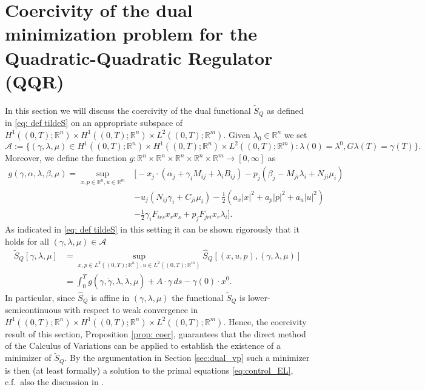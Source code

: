 \documentclass[11pt]{article}
\newcommand{\R}{\mathbb R}
\begin{document}
\section{Coercivity of the dual minimization problem for the Quadratic-Quadratic Regulator (QQR)}\label{sec:analysis}

In this section we will discuss the coercivity of the dual functional $\tilde{S}_Q$ as defined in \eqref{eq: def tildeS} on an appropriate subspace of $H^1((0,T); \R^n) \times H^1((0,T); \R^n) \times L^2((0,T); \R^m)$. 
Given $\lambda_0 \in \R^n$ we set
\[
\mathcal{A}:=\{(\gamma,\lambda,\mu) \in H^1((0,T); \R^n) \times H^1((0,T); \R^n) \times L^2((0,T); \R^m): \lambda(0) = \lambda^0, G \lambda(T) = \gamma(T)  \}.
\]
Moreover, we define the function $g: \R^n \times \R^n \times \R^n \times \R^n \times \R^m \to [0,\infty]$ as
\begin{align*}
g(\gamma,\alpha,\lambda,\beta,\mu) = \sup_{x,p \in\R^n, u \in \R^m} &\bigg[-x_j \cdot ( \alpha_j + \gamma_i M_{ij} + \lambda_i B_{ij} ) - p_j ( \beta_j -  M_{ji} \lambda_i + N_{ji} \mu_i ) \\ & - u_j ( N_{ij} \gamma_i + C_{ji} \mu_i)  - \frac12\left( a_x |x |^2 + a_p |p|^2 + a_u |u|^2 \right) \\ & - \frac12 \gamma_i F_{irs} x_r x_s + p_j F_{jri} x_r \lambda_i \bigg].
\end{align*}
As indicated in \eqref{eq: def tildeS} in this setting it can be shown rigorously that it holds for all $(\gamma,\lambda,\mu) \in \mathcal{A}$
\begin{align*}
\tilde{S}_Q[\gamma,\lambda,\mu] &= \sup_{x,p \in L^2((0,T);\R^n), u\in L^2((0,T);\R^m)} \hat{S}_Q[(x,u,p),(\gamma,\lambda,\mu)] \\ &=\int_0^T g(\gamma,\dot{\gamma},\lambda,\dot{\lambda},\mu) + A \cdot \gamma\, ds - \gamma(0)\cdot x^0. 
\end{align*}
In particular, since $\hat{S}_Q$ is affine in $(\gamma,\lambda,\mu)$ the functional $\tilde{S}_Q$ is lower-semicontinuous with respect to weak convergence in $H^1((0,T);\R^n) \times H^1((0,T);\R^n) \times L^2((0,T);\R^m)$.
Hence, the coercivity result of this section, Proposition \ref{prop: coer}, guarantees that the direct method of the Calculus of Variations can be applied to establish the existence of a minimizer of $\tilde{S}_Q$. By the argumentation in Section \ref{sec:dual_vp} such a minimizer is then (at least formally) a solution to the primal equations \eqref{eq:control_EL}, c.f.~also the discussion in \cite[Section 5]{sga}.
\end{document}
